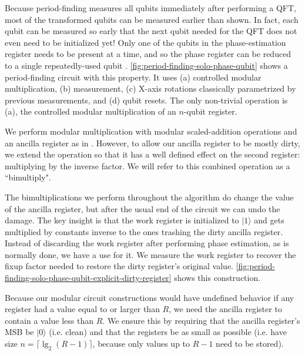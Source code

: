 \documentclass[twocolumn,longbibliography]{quantumarticle}
\begin{document}
Because period-finding measures all qubits immediately after performing a QFT, most of the transformed qubits can be measured earlier than shown.
In fact, each qubit can be measured so early that the next qubit needed for the QFT does not even need to be initialized yet!
Only one of the qubits in the phase-estimation register needs to be present at a time, and so the phase register can be reduced to a single repeatedly-used qubit \cite{zalka1998, mosca1999, parker2000, beauregard2003}.
\autoref{fig:period-finding-solo-phase-qubit} shows a period-finding circuit with this property.
It uses (a) controlled modular multiplication, (b) measurement, (c) X-axis rotations classically parametrized by previous measurements, and (d) qubit resets.
The only non-trivial operation is (a), the controlled modular multiplication of an $n$-qubit register.

We perform modular multiplication with modular scaled-addition operations and an ancilla register as in \cite{beauregard2003}.
However, to allow our ancilla register to be mostly dirty, we extend the operation so that it has a well defined effect on the second register: multiplying by the inverse factor.
We will refer to this combined operation as a ``bimultiply".

The bimultiplications we perform throughout the algorithm do change the value of the ancilla register, but after the usual end of the circuit we can undo the damage.
The key insight is that the work register is initialized to $|1\rangle$ and gets multiplied by constants inverse to the ones trashing the dirty ancilla register.
Instead of discarding the work register after performing phase estimation, as is normally done, we have a use for it.
We measure the work register to recover the fixup factor needed to restore the dirty register's original value.
\autoref{fig:period-finding-solo-phase-qubit-explicit-dirty-register} shows this construction.

Because our modular circuit constructions would have undefined behavior if any register had a value equal to or larger than $R$, we need the ancilla register to contain a value less than $R$.
We ensure this by requiring that the ancilla register's MSB be $|0\rangle$ (i.e. clean) and that the registers be as small as possible (i.e. have size $n = \lceil \lg_2(R-1) \rceil$, because only values up to $R-1$ need to be stored).
\end{document}
